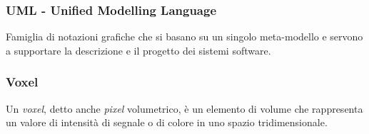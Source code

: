 \subsubsection{UML - Unified Modelling Language}
Famiglia di notazioni grafiche che si basano su un singolo meta-modello e servono a
supportare la descrizione e il progetto dei sistemi software.

\subsubsection{Voxel}
Un \emph{voxel}, detto anche \emph{pixel} volumetrico, è un elemento di volume che rappresenta un valore di intensità di segnale o di colore in uno spazio tridimensionale.





